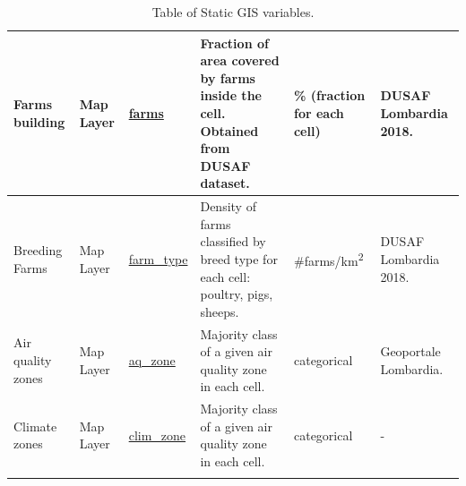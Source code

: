 \begin{center}
\begin{longtable}{ |p{2.2cm}|p{1.5cm}|p{2.3cm}|p{4cm}|p{2.2cm}|p{2.1cm}| }
\multirow{1}{4em}{Farms building} & Map Layer  & \underline{farms} & Fraction of area covered by farms inside the cell. Obtained from DUSAF dataset. & \% (fraction for each cell) & DUSAF Lombardia 2018.\\ \hline
\multirow{1}{4em}{Breeding Farms} & Map Layer  & \underline{farm\_type} & Density of farms classified by breed type for each cell: poultry, pigs, sheeps. & \#farms/km\textsuperscript{2} & DUSAF Lombardia 2018.\\ \hline
\multirow{1}{4em}{Air quality zones} & Map Layer  & \underline{aq\_zone} & Majority class of a given air quality zone in each cell. &categorical & Geoportale Lombardia.\\ \hline
\multirow{1}{4em}{Climate zones} & Map Layer  & \underline{clim\_zone} & Majority class of a given air quality zone in each cell. &categorical& - \\ \hline


\hline
\caption{Table of Static GIS variables.}

\end{longtable}
\end{center}
\pagebreak

